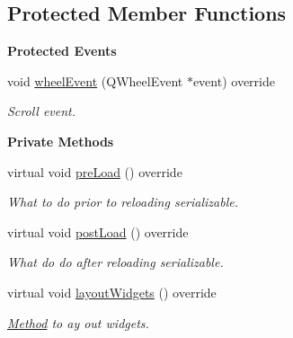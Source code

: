 \subsection*{Protected Member Functions}
\begin{Indent}\textbf{ Protected Events}\par
\begin{DoxyCompactItemize}
\item 
\mbox{\label{classrev_1_1_view_1_1_serializable_widget_a0e36a1580227305d0d75abc6eb533db2}} 
void \mbox{\hyperlink{classrev_1_1_view_1_1_serializable_widget_a0e36a1580227305d0d75abc6eb533db2}{wheel\+Event}} (Q\+Wheel\+Event $\ast$event) override
\begin{DoxyCompactList}\small\item\em Scroll event. \end{DoxyCompactList}\end{DoxyCompactItemize}
\end{Indent}
\begin{Indent}\textbf{ Private Methods}\par
\begin{DoxyCompactItemize}
\item 
\mbox{\label{classrev_1_1_view_1_1_serializable_widget_a3221933de63953a2ef2bba01e605d335}} 
virtual void \mbox{\hyperlink{classrev_1_1_view_1_1_serializable_widget_a3221933de63953a2ef2bba01e605d335}{pre\+Load}} () override
\begin{DoxyCompactList}\small\item\em What to do prior to reloading serializable. \end{DoxyCompactList}\item 
\mbox{\label{classrev_1_1_view_1_1_serializable_widget_a9972362f0b70e94ed3855d6f619f22dd}} 
virtual void \mbox{\hyperlink{classrev_1_1_view_1_1_serializable_widget_a9972362f0b70e94ed3855d6f619f22dd}{post\+Load}} () override
\begin{DoxyCompactList}\small\item\em What do do after reloading serializable. \end{DoxyCompactList}\item 
\mbox{\label{classrev_1_1_view_1_1_serializable_widget_a2ce41025802c273534a1b15460f36fe1}} 
virtual void \mbox{\hyperlink{classrev_1_1_view_1_1_serializable_widget_a2ce41025802c273534a1b15460f36fe1}{layout\+Widgets}} () override
\begin{DoxyCompactList}\small\item\em \mbox{\hyperlink{struct_method}{Method}} to ay out widgets. \end{DoxyCompactList}\end{DoxyCompactItemize}
\end{Indent}

